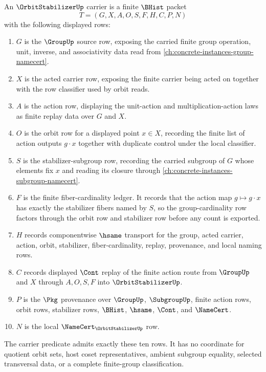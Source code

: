 \begin{definition}
\label{def:orbit-stabilizer-carrier}
An $\OrbitStabilizerUp$ carrier is a finite $\BHist$ packet
$$
T=(G,X,A,O,S,F,H,C,P,N)
$$
with the following displayed rows:
\begin{enumerate}
\item $G$ is the $\GroupUp$ source row, exposing the carried finite group operation, unit, inverse, and associativity data read from \autoref{ch:concrete-instances-group-namecert}.
\item $X$ is the acted carrier row, exposing the finite carrier being acted on together with the row classifier used by orbit reads.
\item $A$ is the action row, displaying the unit-action and multiplication-action laws as finite replay data over $G$ and $X$.
\item $O$ is the orbit row for a displayed point $x\in X$, recording the finite list of action outputs $g\cdot x$ together with duplicate control under the local classifier.
\item $S$ is the stabilizer-subgroup row, recording the carried subgroup of $G$ whose elements fix $x$ and reading its closure through \autoref{ch:concrete-instances-subgroup-namecert}.
\item $F$ is the finite fiber-cardinality ledger. It records that the action map $g\mapsto g\cdot x$ has exactly the stabilizer fibers named by $S$, so the group-cardinality row factors through the orbit row and stabilizer row before any count is exported.
\item $H$ records componentwise $\hsame$ transport for the group, acted carrier, action, orbit, stabilizer, fiber-cardinality, replay, provenance, and local naming rows.
\item $C$ records displayed $\Cont$ replay of the finite action route from $\GroupUp$ and $X$ through $A,O,S,F$ into $\OrbitStabilizerUp$.
\item $P$ is the $\Pkg$ provenance over $\GroupUp$, $\SubgroupUp$, finite action rows, orbit rows, stabilizer rows, $\BHist$, $\hsame$, $\Cont$, and $\NameCert$.
\item $N$ is the local $\NameCert_{\OrbitStabilizerUp}$ row.
\end{enumerate}
The carrier predicate admits exactly these ten rows. It has no coordinate for quotient orbit sets, host coset representatives, ambient subgroup equality, selected transversal data, or a complete finite-group classification.
\end{definition}

